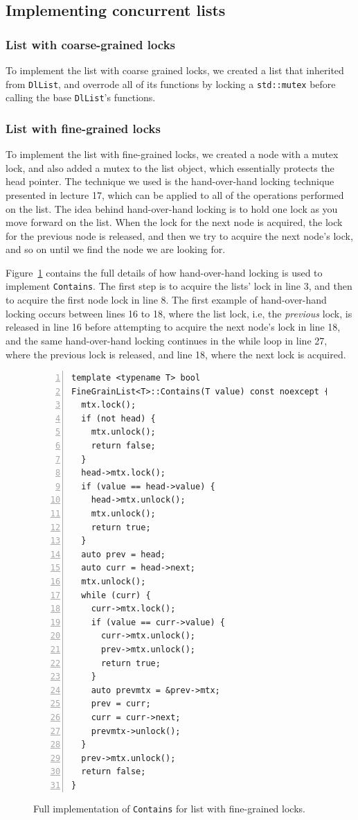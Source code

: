 \documentclass[11pt]{article}
\begin{document}
\subsection{Implementing concurrent lists}

\subsubsection{List with coarse-grained locks}
To implement the list with coarse grained locks, we created a list that
inherited from {\tt DlList}, and overrode all of its functions by locking a
{\tt std::mutex} before calling the base {\tt DlList}'s functions.

\subsubsection{List with fine-grained locks}
To implement the list with fine-grained locks, we created a node with a mutex
lock, and also added a mutex to the list object, which essentially protects the
head pointer. The technique we used is the hand-over-hand locking technique
presented in lecture 17, which can be applied to all of the operations performed
on the list. The idea behind hand-over-hand locking is to hold one lock as you
move forward on the list. When the lock for the next node is acquired, the lock
for the previous node is released, and then we try to acquire the next node's
lock, and so on until we find the node we are looking for.

Figure~\ref{fig:finegrain} contains the full details of how hand-over-hand
locking is used to implement {\tt Contains}. The first step is to acquire the
lists' lock in line 3, and then to acquire the first node lock in line 8. The
first example of hand-over-hand locking occurs between lines 16 to 18, where the
list lock, i.e, the {\it previous} lock, is released in line 16 before
attempting to acquire the next node's lock in line 18, and the same
hand-over-hand locking continues in the while loop in line 27, where the
previous lock is released, and line 18, where the next lock is acquired.

\begin{figure}[h]
\begin{center}
\begin{lstlisting}[numbers=left]
template <typename T> bool
FineGrainList<T>::Contains(T value) const noexcept {
  mtx.lock();
  if (not head) {
    mtx.unlock();
    return false;
  }
  head->mtx.lock();
  if (value == head->value) {
    head->mtx.unlock();
    mtx.unlock();
    return true;
  }
  auto prev = head;
  auto curr = head->next;
  mtx.unlock();
  while (curr) {
    curr->mtx.lock();
    if (value == curr->value) {
      curr->mtx.unlock();
      prev->mtx.unlock();
      return true;
    }
    auto prevmtx = &prev->mtx;
    prev = curr;
    curr = curr->next;
    prevmtx->unlock();
  }
  prev->mtx.unlock();
  return false;
}
\end{lstlisting}
\caption{
Full implementation of {\tt Contains} for list with fine-grained locks.}
\label{fig:finegrain}
\end{center}
\end{figure}
\end{document}
